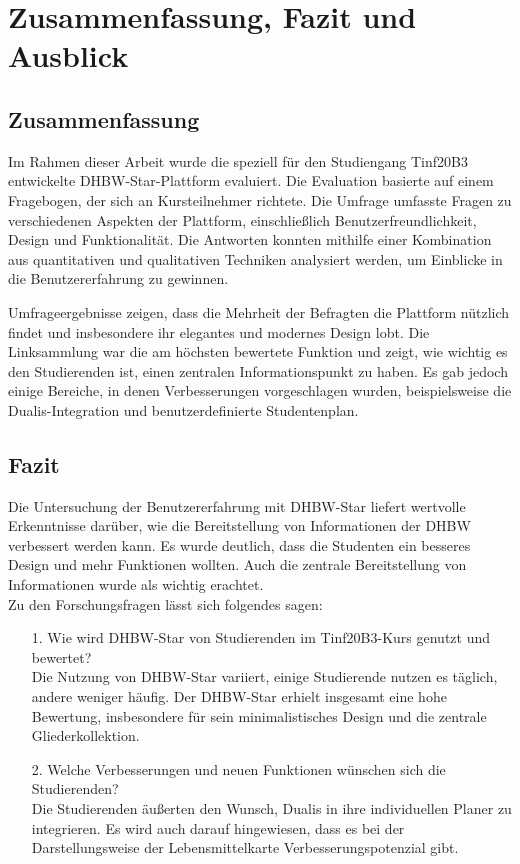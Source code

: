 \chapter{Zusammenfassung, Fazit und Ausblick}

\section{Zusammenfassung}
Im Rahmen dieser Arbeit wurde die speziell für den Studiengang Tinf20B3 entwickelte DHBW-Star-Plattform evaluiert. Die Evaluation basierte auf einem Fragebogen, der sich an Kursteilnehmer richtete. Die Umfrage umfasste Fragen zu verschiedenen Aspekten der Plattform, einschließlich Benutzerfreundlichkeit, Design und Funktionalität. Die Antworten konnten mithilfe einer Kombination aus quantitativen und qualitativen Techniken analysiert werden, um Einblicke in die Benutzererfahrung zu gewinnen.
 
Umfrageergebnisse zeigen, dass die Mehrheit der Befragten die Plattform nützlich findet und insbesondere ihr elegantes und modernes Design lobt. Die Linksammlung war die am höchsten bewertete Funktion und zeigt, wie wichtig es den Studierenden ist, einen zentralen Informationspunkt zu haben. Es gab jedoch einige Bereiche, in denen Verbesserungen vorgeschlagen wurden, beispielsweise die Dualis-Integration und benutzerdefinierte Studentenplan.
\newpage

\section{Fazit}
Die Untersuchung der Benutzererfahrung mit DHBW-Star liefert wertvolle Erkenntnisse darüber, wie die Bereitstellung von Informationen der DHBW verbessert werden kann. Es wurde deutlich, dass die Studenten ein besseres Design und mehr Funktionen wollten. Auch die zentrale Bereitstellung von Informationen wurde als wichtig erachtet. 
\\
Zu den Forschungsfragen lässt sich folgendes sagen:
\begin{itemize}
	\item [1.] Wie wird DHBW-Star von Studierenden im Tinf20B3-Kurs genutzt und bewertet?\\
	Die Nutzung von DHBW-Star variiert, einige Studierende nutzen es täglich, andere weniger häufig. Der DHBW-Star erhielt insgesamt eine hohe Bewertung, insbesondere für sein minimalistisches Design und die zentrale Gliederkollektion. 
	\item[2.]Welche Verbesserungen und neuen Funktionen wünschen sich die Studierenden?\\
	Die Studierenden äußerten den Wunsch, Dualis in ihre individuellen Planer zu integrieren. Es wird auch darauf hingewiesen, dass es bei der Darstellungsweise der Lebensmittelkarte Verbesserungspotenzial gibt.
\end{itemize}

